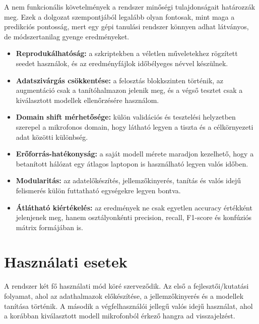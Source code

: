 A nem funkcionális követelmények a rendszer minőségi tulajdonságait határozzák meg. Ezek a dolgozat szempontjából legalább olyan fontosak, mint maga a predikciós pontosság, mert egy gépi tanulási rendszer könnyen adhat látványos, de módszertanilag gyenge eredményeket.

\begin{itemize}
  \item \textbf{Reprodukálhatóság:} a szkriptekben a véletlen műveletekhez rögzített seedet használok, és az eredményfájlok időbélyeges névvel készülnek.
  \item \textbf{Adatszivárgás csökkentése:} a felosztás blokkszinten történik, az augmentáció csak a tanítóhalmazon jelenik meg, és a végső tesztet csak a kiválasztott modellek ellenőrzésére használom.
  \item \textbf{Domain shift mérhetősége:} külön validációs és tesztelési helyzetben szerepel a mikrofonos domain, hogy látható legyen a tiszta és a célkörnyezeti adat közötti különbség.
  \item \textbf{Erőforrás-hatékonyság:} a saját modell mérete maradjon kezelhető, hogy a betanított hálózat egy átlagos laptopon is használható legyen valós időben.
  \item \textbf{Modularitás:} az adatelőkészítés, jellemzőkinyerés, tanítás és valós idejű felismerés külön futtatható egységekre legyen bontva.
  \item \textbf{Átlátható kiértékelés:} az eredmények ne csak egyetlen accuracy értékként jelenjenek meg, hanem osztályonkénti precision, recall, F1-score és konfúziós mátrix formájában is.
\end{itemize}

\section{Használati esetek}

A rendszer két fő használati mód köré szerveződik. Az első a fejlesztői/kutatási folyamat, ahol az adathalmazok előkészítése, a jellemzőkinyerés és a modellek tanítása történik. A második a végfelhasználói jellegű valós idejű használat, ahol a korábban kiválasztott modell mikrofonból érkező hangra ad visszajelzést.

